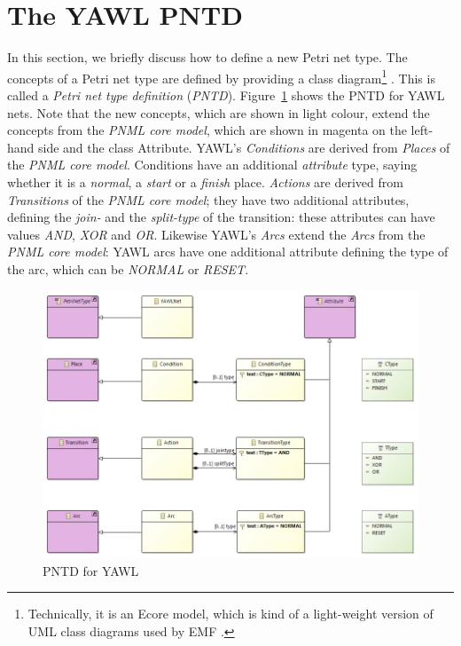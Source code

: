\documentclass[a4paper]{llncs}
\begin{document}
\section{The YAWL PNTD}
\label{sec:yawl-pntd}

In this section, we briefly discuss how to define a new Petri net type. The
concepts of a Petri net type are defined by providing a class diagram\footnote
  {Technically, it is an Ecore model, which is kind of a light-weight version
   of UML class diagrams used by EMF \cite{BSM06}.}%
. This is called a \emph{Petri net type definition} (\emph{PNTD}).
Figure~\ref{fig:YAWLPNTD} shows the PNTD for YAWL nets. Note that the new concepts,
which are shown in light colour, extend the concepts from the \emph{PNML core model},
which are shown in magenta on the left-hand side and the class {\sf Attribute}.
YAWL's \emph{Conditions} are derived from \emph{Places} of the
\emph{PNML core model}.  Conditions have an additional \emph{attribute}
type, saying whether it is a \emph{normal}, a \emph{start} or a \emph{finish} place.
\emph{Actions} are derived from \emph{Transitions} of the \emph{PNML core model};
they have two additional attributes, defining the \emph{join-} and the
\emph{split-type} of the transition: these attributes can have values
\emph{AND}, \emph{XOR} and \emph{OR}. Likewise YAWL's \emph{Arcs} extend the
\emph{Arcs} from the \emph{PNML core model}: YAWL arcs have one additional
attribute defining the type of the arc, which can be \emph{NORMAL} or \emph{RESET}.

\begin{figure}[tb!!]
  \centerline{\includegraphics[scale=.35]{yawl-pntd}}
  \caption{PNTD for YAWL}
  \label{fig:YAWLPNTD}
\end{figure}
\end{document}
